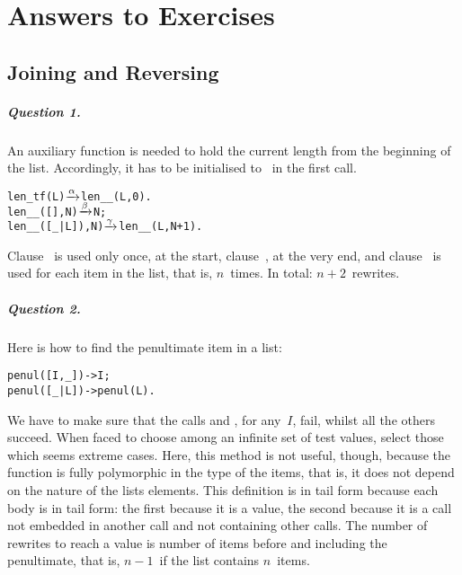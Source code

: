 
\chapter{Answers to Exercises}


\section*{Joining and Reversing}
\label{ans:joining_and_reversing}


\medskip

\paragraph{Question 1.}
An auxiliary function  is needed to hold the
current length from the beginning of the list. Accordingly, it has to
be initialised to~ in the first call.
\begin{alltt}
len\_tf(L)       \(\smashedrightarrow{\alpha}\) len__(L,0).
len__(    [],N) \(\smashedrightarrow{\beta}\) N;
len__([_|L]),N) \(\smashedrightarrow{\gamma}\) len__(L,N+1).
\end{alltt}
Clause~\clause{\alpha} is used only once, at the start,
clause~\clause{\beta}, at the very end, and clause~\clause{\gamma} is
used for each item in the list, that is, \(n\)~times. In total:
\(n+2\)~rewrites.

\medskip

\paragraph{Question 2.}

Here is how to find the penultimate item in a list:
\begin{alltt}
penul([I,_]) -> I;\hfill% \emph{Use a comma}
penul([_|L]) -> penul(L).\hfill% \emph{Use a vertical bar}
\end{alltt}
We have to make sure that the calls  and
, for any~\(I\), fail, whilst all the others
succeed. When faced to choose among an infinite set of test values,
select those which seems extreme cases. Here, this method is not
useful, though, because the function is fully polymorphic in the type
of the items, that is, it does not depend on the nature of the lists
elements. This definition is in tail form because each body is in tail
form: the first because it is a value, the second because it is a call
not embedded in another call and not containing other calls. The
number of rewrites to reach a value is number of items before and
including the penultimate, that is, \(n-1\)~if the list contains
\(n\)~items.

